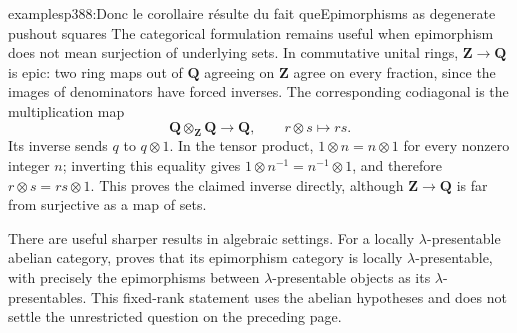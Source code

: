 \begin{dcomment}{examples}{p388:Donc le corollaire résulte du fait que}{Epimorphisms as degenerate pushout squares}
The categorical formulation remains useful when epimorphism does not mean surjection of underlying sets. In commutative unital rings, $\mathbf Z\to\mathbf Q$ is epic: two ring maps out of $\mathbf Q$ agreeing on $\mathbf Z$ agree on every fraction, since the images of denominators have forced inverses. The corresponding codiagonal is the multiplication map
\[
 \mathbf Q\otimes_{\mathbf Z}\mathbf Q\longrightarrow\mathbf Q,
 \qquad r\otimes s\longmapsto rs.
\]
Its inverse sends $q$ to $q\otimes1$. In the tensor product, $1\otimes n=n\otimes1$ for every nonzero integer $n$; inverting this equality gives $1\otimes n^{-1}=n^{-1}\otimes1$, and therefore $r\otimes s=rs\otimes1$. This proves the claimed inverse directly, although $\mathbf Z\to\mathbf Q$ is far from surjective as a map of sets.

There are useful sharper results in algebraic settings. For a locally $\lambda$-presentable abelian category, \citet[Lemma~10.7]{Positselski2024Limits} proves that its epimorphism category is locally $\lambda$-presentable, with precisely the epimorphisms between $\lambda$-presentable objects as its $\lambda$-presentables. This fixed-rank statement uses the abelian hypotheses and does not settle the unrestricted question on the preceding page.
\end{dcomment}

